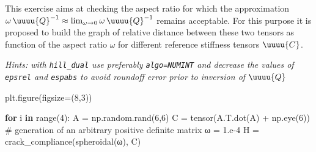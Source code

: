 \documentclass[
  letterpaper,
  DIV=11,
  numbers=noendperiod]{scrreprt}
\newenvironment{Shaded}{\begin{snugshade}}{\end{snugshade}}
\newcommand{\BuiltInTok}[1]{\textcolor[rgb]{0.00,0.23,0.31}{#1}}
\newcommand{\CommentTok}[1]{\textcolor[rgb]{0.37,0.37,0.37}{#1}}
\newcommand{\ControlFlowTok}[1]{\textcolor[rgb]{0.00,0.23,0.31}{\textbf{#1}}}
\newcommand{\DecValTok}[1]{\textcolor[rgb]{0.68,0.00,0.00}{#1}}
\newcommand{\FloatTok}[1]{\textcolor[rgb]{0.68,0.00,0.00}{#1}}
\newcommand{\KeywordTok}[1]{\textcolor[rgb]{0.00,0.23,0.31}{\textbf{#1}}}
\newcommand{\NormalTok}[1]{\textcolor[rgb]{0.00,0.23,0.31}{#1}}
\newcommand{\OperatorTok}[1]{\textcolor[rgb]{0.37,0.37,0.37}{#1}}
\begin{document}
\begin{tcolorbox}[enhanced jigsaw, left=2mm, bottomrule=.15mm, colbacktitle=quarto-callout-caution-color!10!white, colback=white, colframe=quarto-callout-caution-color-frame, rightrule=.15mm, bottomtitle=1mm, toptitle=1mm, titlerule=0mm, title={Exercise}, toprule=.15mm, arc=.35mm, opacityback=0, opacitybacktitle=0.6, leftrule=.75mm, breakable, coltitle=black]

This exercise aims at checking the aspect ratio for which the
approximation
\(\omega\,\uuuu{Q}^{-1}\approx \lim_{\omega\to 0}\omega\,\uuuu{Q}^{-1}\)
remains acceptable. For this purpose it is proposed to build the graph
of relative distance between these two tensors as function of the aspect
ratio \(\omega\) for different reference stiffness tensors \(\uuuu{C}\).

\emph{Hints: with \texttt{hill\_dual} use preferably
\texttt{algo=NUMINT} and decrease the values of \texttt{epsrel} and
\texttt{espabs} to avoid roundoff error prior to inversion of
\(\uuuu{Q}\)}

\begin{Shaded}
\begin{Highlighting}[]
\NormalTok{plt.figure(figsize}\OperatorTok{=}\NormalTok{(}\DecValTok{8}\NormalTok{,}\DecValTok{3}\NormalTok{))}

\ControlFlowTok{for}\NormalTok{ i }\KeywordTok{in} \BuiltInTok{range}\NormalTok{(}\DecValTok{4}\NormalTok{):}
\NormalTok{    A }\OperatorTok{=}\NormalTok{ np.random.rand(}\DecValTok{6}\NormalTok{,}\DecValTok{6}\NormalTok{)}
\NormalTok{    C }\OperatorTok{=}\NormalTok{ tensor(A.T.dot(A) }\OperatorTok{+}\NormalTok{ np.eye(}\DecValTok{6}\NormalTok{)) }\CommentTok{\# generation of an arbitrary positive definite matrix}
\NormalTok{    ω }\OperatorTok{=} \FloatTok{1.e{-}4}
\NormalTok{    H }\OperatorTok{=}\NormalTok{ crack\_compliance(spheroidal(ω), C)}


\end{Highlighting}
\end{Shaded}
\end{tcolorbox}
\end{document}
